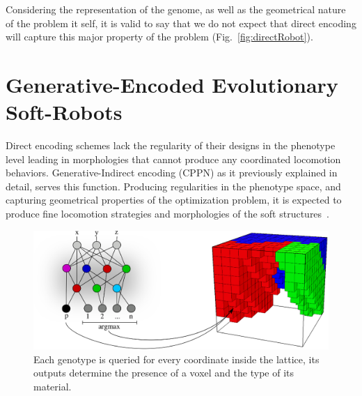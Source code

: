 Considering the representation of the genome, as well as the geometrical nature of the problem it self, it is valid to say that we do not expect that direct encoding will capture this major property of the problem (Fig.~\ref{fig:directRobot}).

\section{Generative-Encoded Evolutionary Soft-Robots}

Direct encoding schemes lack the regularity of their designs in the phenotype level leading in morphologies that cannot produce any coordinated locomotion behaviors. Generative-Indirect encoding (CPPN) as it previously explained in detail, serves this function. Producing regularities in the phenotype space, and capturing geometrical properties of the optimization problem, it is expected to produce fine locomotion strategies and morphologies of the soft structures~\cite{cheney2013unshackling}.

\begin{figure}
\centering
\includegraphics[height=0.2\textheight]{../Figures/Misc/cppnSoftBot2.eps}
\caption{Each genotype is queried for every coordinate inside the lattice, its outputs determine the presence of a voxel and the type of its material.}
\label{fig:cppnDiagram}
\end{figure}


